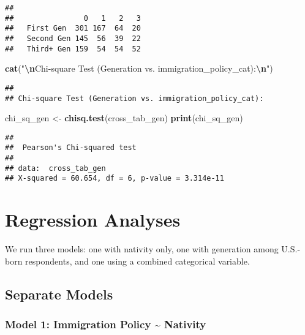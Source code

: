 \documentclass[
]{article}
\newenvironment{Shaded}{\begin{snugshade}}{\end{snugshade}}
\newcommand{\FunctionTok}[1]{\textcolor[rgb]{0.13,0.29,0.53}{\textbf{#1}}}
\newcommand{\NormalTok}[1]{#1}
\newcommand{\OtherTok}[1]{\textcolor[rgb]{0.56,0.35,0.01}{#1}}
\newcommand{\SpecialCharTok}[1]{\textcolor[rgb]{0.81,0.36,0.00}{\textbf{#1}}}
\newcommand{\StringTok}[1]{\textcolor[rgb]{0.31,0.60,0.02}{#1}}
\begin{document}
\begin{verbatim}
##             
##                0   1   2   3
##   First Gen  301 167  64  20
##   Second Gen 145  56  39  22
##   Third+ Gen 159  54  54  52
\end{verbatim}

\begin{Shaded}
\begin{Highlighting}[]
\FunctionTok{cat}\NormalTok{(}\StringTok{"}\SpecialCharTok{\textbackslash{}n}\StringTok{Chi{-}square Test (Generation vs. immigration\_policy\_cat):}\SpecialCharTok{\textbackslash{}n}\StringTok{"}\NormalTok{)}
\end{Highlighting}
\end{Shaded}

\begin{verbatim}
## 
## Chi-square Test (Generation vs. immigration_policy_cat):
\end{verbatim}

\begin{Shaded}
\begin{Highlighting}[]
\NormalTok{chi\_sq\_gen }\OtherTok{\textless{}{-}} \FunctionTok{chisq.test}\NormalTok{(cross\_tab\_gen)}
\FunctionTok{print}\NormalTok{(chi\_sq\_gen)}
\end{Highlighting}
\end{Shaded}

\begin{verbatim}
## 
##  Pearson's Chi-squared test
## 
## data:  cross_tab_gen
## X-squared = 60.654, df = 6, p-value = 3.314e-11
\end{verbatim}

\section{Regression Analyses}\label{regression-analyses}

We run three models: one with nativity only, one with generation among
U.S.-born respondents, and one using a combined categorical variable.

\subsection{Separate Models}\label{separate-models}

\subsubsection{Model 1: Immigration Policy \textasciitilde{}
Nativity}\label{model-1-immigration-policy-nativity}
\end{document}
